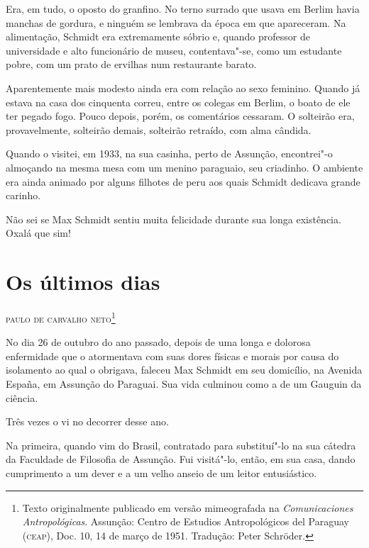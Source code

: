 Era, em tudo, o oposto do granfino. No terno surrado que usava em Berlim
havia manchas de gordura, e ninguém se lembrava da época em que
apareceram. Na alimentação, Schmidt era extremamente sóbrio e, quando
professor de universidade e alto funcionário de museu, contentava"-se,
como um estudante pobre, com um prato de ervilhas num restaurante
barato.

Aparentemente mais modesto ainda era com relação ao sexo feminino.
Quando já estava na casa dos cinquenta correu, entre os colegas em
Berlim, o boato de ele ter pegado fogo. Pouco depois, porém, os
comentários cessaram. O solteirão era, provavelmente, solteirão demais,
solteirão retraído, com alma cândida.

Quando o visitei, em 1933, na sua casinha, perto de Assunção,
encontrei"-o almoçando na mesma mesa com um menino paraguaio, seu
criadinho. O ambiente era ainda animado por alguns filhotes de peru aos
quais Schmidt dedicava grande carinho.

Não sei se Max Schmidt sentiu muita felicidade durante sua longa
existência. Oxalá que sim!

\chapter*{Os últimos dias}

\begin{flushright}
\textsc{paulo de carvalho neto}\footnote{Texto originalmente
  publicado em versão mimeografada na \textit{Comunicaciones
  Antropológicas}. Assunção: Centro de Estudios Antropológicos del
  Paraguay (\textsc{ceap}), Doc. 10, 14 de março de 1951. Tradução: Peter Schröder.}
\end{flushright}

No dia 26 de outubro do ano passado, depois de uma longa e dolorosa
enfermidade que o atormentava com suas dores físicas e morais por causa
do isolamento ao qual o obrigava, faleceu Max Schmidt em seu domicílio,
na Avenida España, em Assunção do Paraguai. Sua vida culminou como a de
um Gauguin da ciência.

Três vezes o vi no decorrer desse ano.

Na primeira, quando vim do Brasil, contratado para substituí"-lo na sua
cátedra da Faculdade de Filosofia de Assunção. Fui visitá"-lo, então, em
sua casa, dando cumprimento a um dever e a um velho anseio de um leitor
entusiástico.

